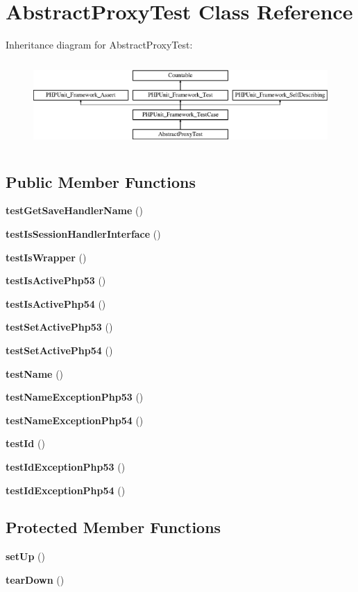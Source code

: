 \section{Abstract\+Proxy\+Test Class Reference}
\label{class_symfony_1_1_component_1_1_http_foundation_1_1_tests_1_1_session_1_1_storage_1_1_proxy_1_1_abstract_proxy_test}
Inheritance diagram for Abstract\+Proxy\+Test\+:\begin{figure}[H]
\begin{center}
\leavevmode
\includegraphics[height=3.303835cm]{class_symfony_1_1_component_1_1_http_foundation_1_1_tests_1_1_session_1_1_storage_1_1_proxy_1_1_abstract_proxy_test}
\end{center}
\end{figure}
\subsection*{Public Member Functions}
\begin{DoxyCompactItemize}
\item 
{\bf test\+Get\+Save\+Handler\+Name} ()
\item 
{\bf test\+Is\+Session\+Handler\+Interface} ()
\item 
{\bf test\+Is\+Wrapper} ()
\item 
{\bf test\+Is\+Active\+Php53} ()
\item 
{\bf test\+Is\+Active\+Php54} ()
\item 
{\bf test\+Set\+Active\+Php53} ()
\item 
{\bf test\+Set\+Active\+Php54} ()
\item 
{\bf test\+Name} ()
\item 
{\bf test\+Name\+Exception\+Php53} ()
\item 
{\bf test\+Name\+Exception\+Php54} ()
\item 
{\bf test\+Id} ()
\item 
{\bf test\+Id\+Exception\+Php53} ()
\item 
{\bf test\+Id\+Exception\+Php54} ()
\end{DoxyCompactItemize}
\subsection*{Protected Member Functions}
\begin{DoxyCompactItemize}
\item 
{\bf set\+Up} ()
\item 
{\bf tear\+Down} ()
\end{DoxyCompactItemize}
